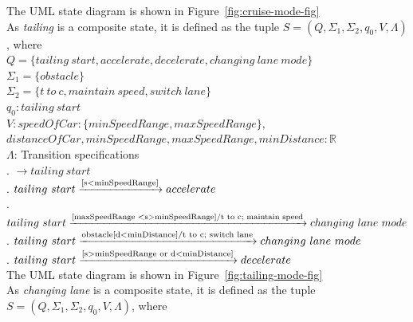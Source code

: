 \documentclass[12pt]{article}
\begin{document}
\begin{spacing}{1.5}
\noindent The UML state diagram is shown in Figure~\ref{fig:cruise-mode-fig}\\


\noindent As \textit{tailing} is a composite state, it is defined as the tuple $S = (Q, \Sigma_1, \Sigma_2, q_0, V, \Lambda)$, where\\

\noindent $Q = \{tailing~start, accelerate, decelerate, changing~lane~mode\}$\\
\noindent $\Sigma_1 = \{obstacle\}$\\
\noindent $\Sigma_2 = \{t~to~c, maintain~speed, switch~lane\}$\\
\noindent $q_0: tailing~start$\\
\noindent $V: speedOfCar : \{minSpeedRange, maxSpeedRange\},$\\
\indent $distanceOfCar, minSpeedRange, maxSpeedRange, minDistance: \mathbb{R} $\\
\noindent $\Lambda$: Transition specifications\\
. $\rightarrow tailing~start$\\
. $tailing~start\xrightarrow {\text{[s\textless minSpeedRange]}} accelerate$\\
. $tailing~start\xrightarrow {\text{[maxSpeedRange \textless s\textgreater minSpeedRange]/t to c; maintain speed}} changing~lane~mode$\\
. $tailing~start\xrightarrow {\text{obstacle[d\textless minDistance]/t to c; switch lane}} changing~lane~mode$\\
. $tailing~start\xrightarrow {\text{[s\textgreater minSpeedRange or d\textless minDistance]}} decelerate$\\

\noindent The UML state diagram is shown in Figure~\ref{fig:tailing-mode-fig}\\


\noindent As \textit{changing lane} is a composite state, it is defined as the tuple $S = (Q, \Sigma_1, \Sigma_2, q_0, V, \Lambda)$, where\\


\end{spacing}
\end{document}
